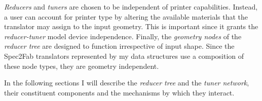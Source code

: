 	\emph{Reducers} and \emph{tuners} are chosen to be independent of printer capabilities. Instead, a user can account for printer type by altering the available materials that the translator may assign to the input geometry.  This is important since it grants the \emph{reducer-tuner} model  device independence. Finally, the \emph{geometry nodes} of the \emph{reducer tree} are designed to function irrespective of input shape. Since the Spec2Fab translators represented by my data structures use a composition of these node types, they are geometry independent. 
	
	In the following sections I will describe the \emph{reducer tree} and the \emph{tuner network}, their constituent components and the mechanisms by which they interact. 
